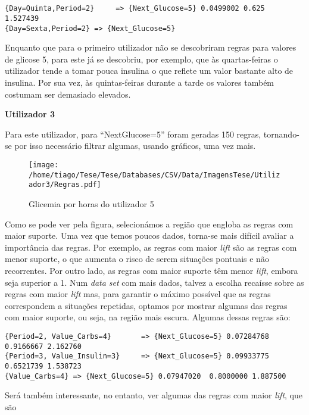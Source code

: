 \begin{lstlisting}


{Day=Quinta,Period=2}     => {Next_Glucose=5} 0.0499002 0.625      1.527439
{Day=Sexta,Period=2} => {Next_Glucose=5}

\end{lstlisting}

Enquanto que para o primeiro utilizador não se descobriram regras para valores de glicose 5, para este já se descobriu, por exemplo, que às quartas-feiras o utilizador tende a tomar pouca insulina o que reflete um valor bastante alto de insulina. Por sua vez, às quintas-feiras durante a tarde os valores também costumam ser demasiado elevados. 






\textbf{Utilizador 3}

Para este utilizador, para ``Next\textunderscore Glucose=5'' foram geradas 150 regras, tornando-se por isso necessário filtrar algumas, usando gráficos, uma vez mais. 


\begin{figure}[H]
\centering
\texttt{[image: /home/tiago/Tese/Tese/Databases/CSV/Data/ImagensTese/Utilizador3/Regras.pdf]}
\caption{Glicemia por horas do utilizador 5}
\end{figure}

Como se pode ver pela figura, selecionámos a região que engloba as regras com maior suporte. Uma vez que temos poucos dados, torna-se mais difícil avaliar a importância das regras. Por exemplo, as regras com maior \textit{lift} são as regras com menor suporte, o que aumenta o risco de serem situações pontuais e não recorrentes. Por outro lado, as regras com maior suporte têm menor \textit{lift}, embora seja superior a 1. Num \textit{data set} com mais dados, talvez a escolha recaísse sobre as regras com maior \textit{lift} mas, para garantir o máximo possível que as regras correspondem a situações repetidas, optamos por mostrar algumas das regras com maior suporte, ou seja, na região mais escura. Algumas dessas regras são:

\begin{lstlisting}
{Period=2, Value_Carbs=4}       => {Next_Glucose=5} 0.07284768  0.9166667 2.162760  
{Period=3, Value_Insulin=3}     => {Next_Glucose=5} 0.09933775  0.6521739 1.538723
{Value_Carbs=4} => {Next_Glucose=5} 0.07947020  0.8000000 1.887500
\end{lstlisting}

Será também interessante, no entanto, ver algumas das regras com maior \textit{lift}, que são

